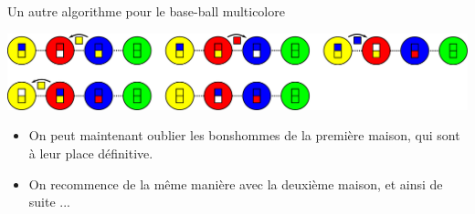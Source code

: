 \begin{frame}{Un autre algorithme pour le base-ball multicolore}
  \begin{center}
    \includegraphics[width=0.8\linewidth]{img/baseball_ex3.pdf}
  \end{center}

  \begin{itemize}
  \item On peut maintenant oublier les bonshommes de la première maison, qui sont à leur place définitive.
  \item On recommence de la même manière avec la deuxième maison, et ainsi de suite ...
  \end{itemize}
\end{frame}

